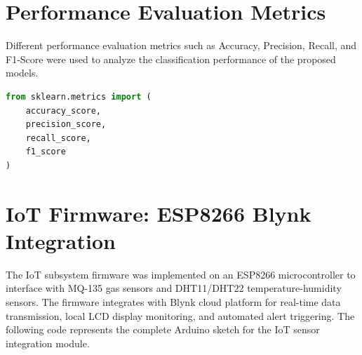 \section[Performance Evaluation Metrics]{\textbf{Performance Evaluation Metrics}}
Different performance evaluation metrics such as Accuracy, Precision, Recall, and F1-Score were used to analyze the classification performance of the proposed models.

\begin{lstlisting}[language=Python, caption=Evaluation metrics import]
from sklearn.metrics import (
    accuracy_score,
    precision_score,
    recall_score,
    f1_score
)
\end{lstlisting}

\section[IoT Firmware: ESP8266 Blynk Integration]{\textbf{IoT Firmware: ESP8266 Blynk Integration}}
The IoT subsystem firmware was implemented on an ESP8266 microcontroller to interface with MQ-135 gas sensors and DHT11/DHT22 temperature-humidity sensors. The firmware integrates with Blynk cloud platform for real-time data transmission, local LCD display monitoring, and automated alert triggering. The following code represents the complete Arduino sketch for the IoT sensor integration module.

